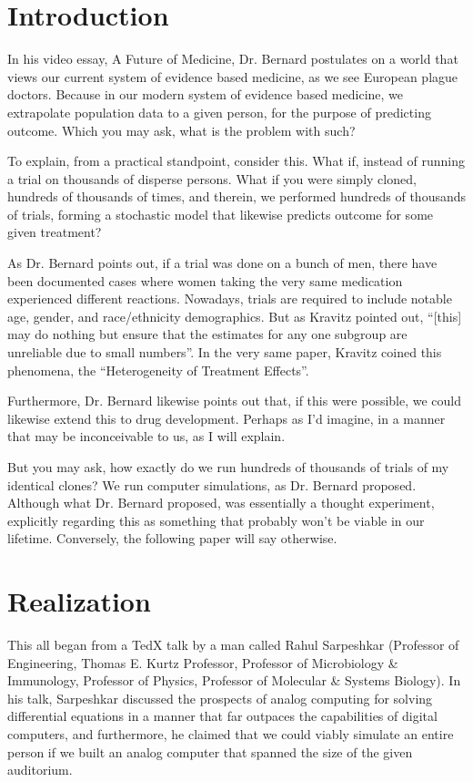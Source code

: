 \section*{Introduction}

In his video essay, A Future of Medicine, Dr. Bernard postulates on a world that views our current system of evidence based medicine, as we see European plague doctors. Because in our modern system of evidence based medicine, we extrapolate population data to a given person, for the purpose of predicting outcome. Which you may ask, what is the problem with such? 

To explain, from a practical standpoint, consider this. What if, instead of running a trial on thousands of disperse persons. What if you were simply cloned, hundreds of thousands of times, and therein, we performed hundreds of thousands of trials, forming a stochastic model that likewise predicts outcome for some given treatment?

As Dr. Bernard points out, if a trial was done on a bunch of men, there have been documented cases where women taking the very same medication experienced different reactions. Nowadays, trials are required to include notable age, gender, and race/ethnicity demographics. But as Kravitz pointed out, ``[this] may do nothing but ensure that the estimates for any one subgroup are unreliable due to small numbers''. In the very same paper, Kravitz coined this phenomena, the ``Heterogeneity of Treatment Effects''. 

Furthermore, Dr. Bernard likewise points out that, if this were possible, we could likewise extend this to drug development. Perhaps as I'd imagine, in a manner that may be inconceivable to us, as I will explain.

But you may ask, how exactly do we run hundreds of thousands of trials of my identical clones? We run computer simulations, as Dr. Bernard proposed. Although what Dr. Bernard proposed, was essentially a thought experiment, explicitly regarding this as something that probably won't be viable in our lifetime. Conversely, the following paper will say otherwise. 

\section*{Realization}


This all began from a TedX talk by a man called Rahul Sarpeshkar (Professor of Engineering, Thomas E. Kurtz Professor, Professor of Microbiology \& Immunology, Professor of Physics, Professor of Molecular \& Systems Biology). In his talk, Sarpeshkar discussed the prospects of analog computing for solving differential equations in a manner that far outpaces the capabilities of digital computers, and furthermore, he claimed that we could viably simulate an entire person if we built an analog computer that spanned the size of the given auditorium.

